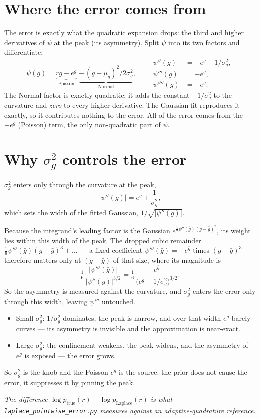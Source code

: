 \documentclass[11pt]{article}
\newcommand{\gbar}{\bar{g}}
\begin{document}
\section{Where the error comes from}
The error is exactly what the quadratic expansion drops: the third and higher
derivatives of $\psi$ at the peak (its asymmetry). Split $\psi$ into its two
factors and differentiate:
\[
  \psi(g) = \underbrace{r g - e^{g}}_{\text{Poisson}}
          \;\underbrace{-\,(g-\mu_g)^2/2\sigma_g^2}_{\text{Normal}},
\qquad
\begin{aligned}
  \psi''(g)   &= -e^{g} - 1/\sigma_g^2,\\
  \psi'''(g)  &= -e^{g},\\
  \psi''''(g) &= -e^{g}.
\end{aligned}
\]
The Normal factor is exactly quadratic: it adds the constant $-1/\sigma_g^2$ to
the curvature and \emph{zero} to every higher derivative. The Gaussian fit
reproduces it exactly, so it contributes nothing to the error. All of the error
comes from the $-e^{g}$ (Poisson) term, the only non-quadratic part of $\psi$.

\section{Why $\sigma_g^2$ controls the error}
$\sigma_g^2$ enters only through the curvature at the peak,
\[
  |\psi''(\gbar)| = e^{\gbar} + \frac{1}{\sigma_g^2},
\]
which sets the width of the fitted Gaussian, $1/\sqrt{|\psi''(\gbar)|}$.

Because the integrand's leading factor is the Gaussian
$e^{\frac12\psi''(\gbar)(g-\gbar)^2}$, its weight lies within this width of the
peak. The dropped cubic remainder $\tfrac16\psi'''(\gbar)(g-\gbar)^3+\dots$ --- a
fixed coefficient $\psi'''(\gbar)=-e^{\gbar}$ times $(g-\gbar)^3$ --- therefore
matters only at $(g-\gbar)$ of that size, where its magnitude is
\[
  \tfrac16\,\frac{|\psi'''(\gbar)|}{|\psi''(\gbar)|^{3/2}}
  = \tfrac16\,\frac{e^{\gbar}}{\big(e^{\gbar}+1/\sigma_g^2\big)^{3/2}} .
\]
So the asymmetry is measured against the curvature, and $\sigma_g^2$ enters the
error only through this width, leaving $\psi'''$ untouched.
\begin{itemize}
\item Small $\sigma_g^2$: $1/\sigma_g^2$ dominates, the peak is narrow, and over
that width $e^{g}$ barely curves — its asymmetry is invisible and the
approximation is near-exact.
\item Large $\sigma_g^2$: the confinement weakens, the peak widens, and the
asymmetry of $e^{g}$ is exposed — the error grows.
\end{itemize}
So $\sigma_g^2$ is the knob and the Poisson $e^{g}$ is the source: the prior
does not cause the error, it suppresses it by pinning the peak.

\medskip
\noindent\textit{The difference $\log p_{\mathrm{true}}(r)-\log p_{\mathrm{Laplace}}(r)$
is what \texttt{laplace\_pointwise\_error.py} measures against an
adaptive-quadrature reference.}
\end{document}
